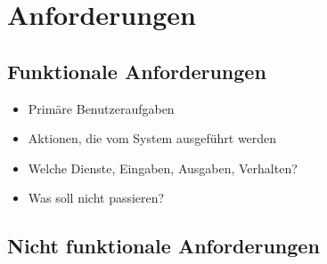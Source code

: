 \documentclass[main.tex]{subfiles}
\begin{document}
\section{Anforderungen}
\subsection*{Funktionale Anforderungen}
\begin{itemize}
    \item Primäre Benutzeraufgaben
    \item Aktionen, die vom System ausgeführt werden
    \item Welche Dienste, Eingaben, Ausgaben, Verhalten? 
    \item Was soll nicht passieren? 
\end{itemize}
\subsection*{Nicht funktionale Anforderungen}
\end{document}
